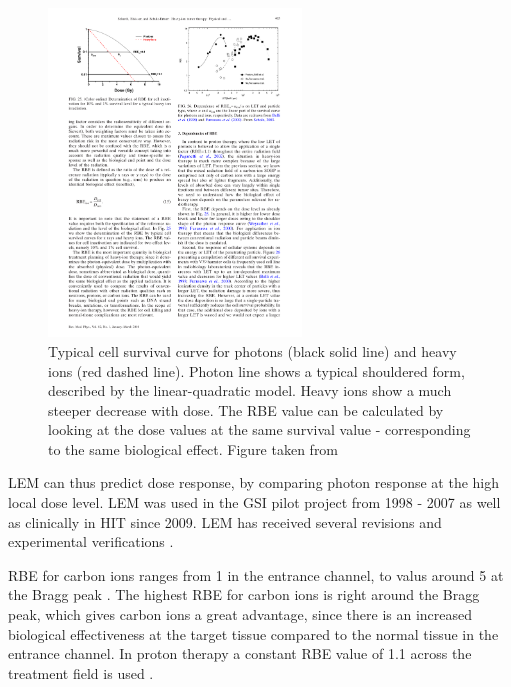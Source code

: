 \documentclass[type=dr, dr=rernat, accentcolor=tud7b,colorbacktitle, bigchapter, openright, twoside, 12pt ]{tudthesis}
\begin{document}
\newpage

\begin{figure}[H]
\begin{center}
\includegraphics[width=0.6\textwidth]{./Images/dose_dependence.pdf}
\caption{Typical cell survival curve for photons (black solid line) and heavy ions (red dashed line). Photon line shows a typical shouldered form, described by the linear-quadratic model.
Heavy ions show a much steeper decrease with dose. The RBE value can be calculated by looking at the dose values at the same survival value - corresponding to the same biological effect. Figure taken from \cite{Schardt2010}}
\label{dosedep}
\end{center}
\end{figure}

 
LEM can thus predict dose response, by comparing
photon response at the high local dose level. LEM was used in the GSI pilot project from 1998 - 2007 \cite{Kraemer2000, Kraemer2000a} as well as clinically in HIT since 2009. LEM has received several revisions \cite{Elsaesser2006, Elsaesser2007, Elsaesser2009} and experimental verifications
\cite{Mitaroff1998, Kraemer2000a, Kraemer2003}. 

RBE for carbon ions ranges from 1 in the entrance channel, to valus around 5 at 
the Bragg peak \cite{Kraft2000}. The highest RBE for carbon ions is right around the Bragg peak, which gives carbon ions a great advantage, since there is an increased 
biological effectiveness at the target tissue compared to the normal tissue in the entrance channel. In proton therapy a constant RBE value of 1.1 across the treatment field
is used \cite{Paganetti2002}.
\end{document}
